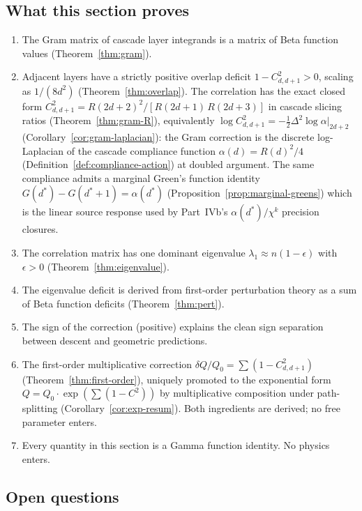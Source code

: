 \documentclass[11pt,a4paper]{article}
\begin{document}
\subsection{What this section proves}

\begin{enumerate}
\item The Gram matrix of cascade layer integrands is a matrix of Beta function values (Theorem~\ref{thm:gram}).
\item Adjacent layers have a strictly positive overlap deficit $1 - C_{d,d+1}^2 > 0$, scaling as $1/(8d^2)$ (Theorem~\ref{thm:overlap}). The correlation has the exact closed form $C^2_{d,d+1} = R(2d+2)^2 / [R(2d+1)\,R(2d+3)]$ in cascade slicing ratios (Theorem~\ref{thm:gram-R}), equivalently $\log C^2_{d,d+1} = -\tfrac{1}{2}\Delta^2 \log\alpha\big|_{2d+2}$ (Corollary~\ref{cor:gram-laplacian}): the Gram correction is the discrete log-Laplacian of the cascade compliance function $\alpha(d) = R(d)^2/4$ (Definition~\ref{def:compliance-action}) at doubled argument. The same compliance admits a marginal Green's function identity $G(d^*) - G(d^*+1) = \alpha(d^*)$ (Proposition~\ref{prop:marginal-greens}) which is the linear source response used by Part~IVb's $\alpha(d^*)/\chi^k$ precision closures.
\item The correlation matrix has one dominant eigenvalue $\lambda_1 \approx n(1 - \epsilon)$ with $\epsilon > 0$ (Theorem~\ref{thm:eigenvalue}).
\item The eigenvalue deficit is derived from first-order perturbation theory as a sum of Beta function deficits (Theorem~\ref{thm:pert}).
\item The sign of the correction (positive) explains the clean sign separation between descent and geometric predictions.
\item The first-order multiplicative correction $\delta Q / Q_0 = \sum(1-C^2_{d,d+1})$ (Theorem~\ref{thm:first-order}), uniquely promoted to the exponential form $Q = Q_0 \cdot \exp(\sum(1-C^2))$ by multiplicative composition under path-splitting (Corollary~\ref{cor:exp-resum}). Both ingredients are derived; no free parameter enters.
\item Every quantity in this section is a Gamma function identity. No physics enters.
\end{enumerate}

\subsection{Open questions}\label{sec:open}
\end{document}
